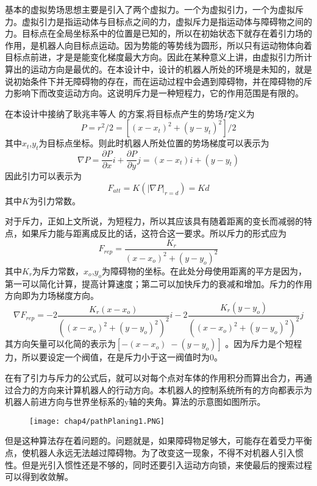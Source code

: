 基本的虚拟势场思想主要是引入了两个虚拟力。一个为虚拟引力，一个为虚拟斥力。虚拟引力是指运动体与目标点之间的力，虚拟斥力是指运动体与障碍物之间的力。目标点在全局坐标系中的位置是已知的，所以在初始状态下就存在着引力场的作用，是机器人向目标点运动。因为势能的等势线为圆形，所以只有运动物体向着目标点前进，才是是能变化梯度最大方向。因此在某种意义上讲，由虚拟引力所计算出的运动方向是最优的。在本设计中，设计的机器人所处的环境是未知的，就是说初始条件下并无障碍物的存在，而在运动过程中会遇到障碍物，并在障碍物的斥力影响下而改变运动方向。这说明斥力是一种短程力，它的作用范围是有限的。

在本设计中接纳了耿兆丰等人 的方案,将目标点产生的势场$P$定义为 \\
\begin{equation}
P = r^2/2 = [(x-x_t)^2+(y-y_t)^2]/2
\end{equation}
其中$x_t$,$y_t$为目标点坐标。则此时机器人所处位置的势场梯度可以表示为 \\
\begin{equation}
\nabla P = \frac{\partial P}{\partial x}i+\frac{\partial P}{\partial y}j = (x-x_t)i+(y-y_t)
\end{equation}
因此引力可以表示为 \\
\begin{equation}
F_{att} = K(|\nabla P|_{r=d})=Kd
\end{equation}
其中$K$为引力常数。

对于斥力，正如上文所说，为短程力，所以其应该具有随着距离的变长而减弱的特点，如果斥力能与距离成反比的话，这符合这一要求。所以斥力的形式应为 \\
\begin{equation}
F_{rep} = \frac{K_r}{(x-x_o)^2+(y-y_o)^2}
\end{equation}
其中$K_r$为斥力常数，$x_o$,$y_o$为障碍物的坐标。在此处分母使用距离的平方是因为，第一可以简化计算，提高计算速度；第二可以加快斥力的衰减和增加。斥力的作用方向即为力场梯度方向。 \\
\begin{equation}
\nabla F_{rep} = -2\frac{K_r(x-x_o)}{((x-x_o)^2+(y-y_o)^2)^2}i-2\frac{K_r(y-y_o)}{((x-x_o)^2+(y-y_o)^2)^2}j
\end{equation}
其方向矢量可以化简的表示为$[-(x-x_o)\; -(y-y_o)]$ 。因为斥力是个短程力，所以要设定一个阀值，在是斥力小于这一阀值时为0。

在有了引力与斥力的公式后，就可以对每个点对车体的作用积分而算出合力，再通过合力的方向来计算机器人的行动方向。本机器人的控制系统所有的方向都表示为机器人前进方向与世界坐标系的y轴的夹角。算法的示意图如图所示。
\begin{figure}[!htp]
  \centering
  \texttt{[image: chap4/pathPlaning1.PNG]}
\end{figure}
但是这种算法存在着问题的。问题就是，如果障碍物足够大，可能存在着受力平衡点，使机器人永远无法越过障碍物。为了改变这一现象，不得不对机器人引入惯性。但是光引入惯性还是不够的，同时还要引入运动方向锁，来使最后的搜索过程可以得到收敛解。
